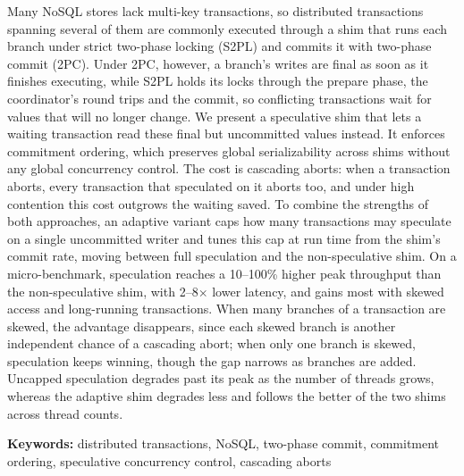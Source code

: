 Many NoSQL stores lack multi-key transactions, so distributed transactions spanning several of them
are commonly executed through a shim that runs each branch under strict two-phase locking (S2PL)
and commits it with two-phase commit (2PC). Under 2PC, however, a branch's writes are final as soon
as it finishes executing, while S2PL holds its locks through the prepare phase, the coordinator's
round trips and the commit, so conflicting transactions wait for values that will no longer change.
We present a speculative shim that lets a waiting transaction read these final but uncommitted
values instead. It enforces commitment ordering, which preserves global serializability across
shims without any global concurrency control. The cost is cascading aborts: when a transaction
aborts, every transaction that speculated on it aborts too, and under high contention this cost
outgrows the waiting saved. To combine the strengths of both approaches, an adaptive variant caps
how many transactions may speculate on a single uncommitted writer and tunes this cap at run time
from the shim's commit rate, moving between full speculation and the non-speculative shim. On a
micro-benchmark, speculation reaches a 10--100\% higher peak throughput than the non-speculative
shim, with 2--8$\times$ lower latency, and gains most with skewed access and long-running
transactions. When many branches of a transaction are skewed, the advantage disappears, since each
skewed branch is another independent chance of a cascading abort; when only one branch is skewed,
speculation keeps winning, though the gap narrows as branches are added. Uncapped speculation
degrades past its peak as the number of threads grows, whereas the adaptive shim degrades less and
follows the better of the two shims across thread counts.

\vspace{1em}
\noindent\textbf{Keywords:} distributed transactions, NoSQL, two-phase commit, commitment ordering,
speculative concurrency control, cascading aborts

